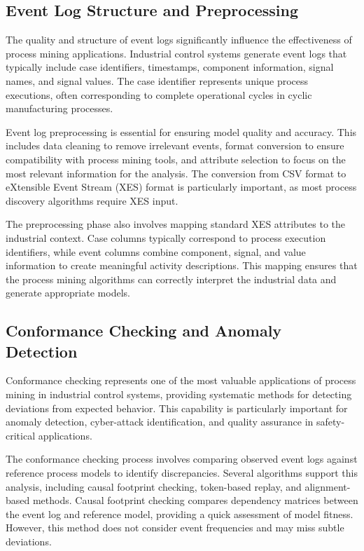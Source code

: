 \subsection{Event Log Structure and Preprocessing}

The quality and structure of event logs significantly influence the effectiveness of process mining applications. Industrial control systems generate event logs that typically include case identifiers, timestamps, component information, signal names, and signal values. The case identifier represents unique process executions, often corresponding to complete operational cycles in cyclic manufacturing processes.

Event log preprocessing is essential for ensuring model quality and accuracy. This includes data cleaning to remove irrelevant events, format conversion to ensure compatibility with process mining tools, and attribute selection to focus on the most relevant information for the analysis. The conversion from CSV format to eXtensible Event Stream (XES) format is particularly important, as most process discovery algorithms require XES input.


The preprocessing phase also involves mapping standard XES attributes to the industrial context. Case columns typically correspond to process execution identifiers, while event columns combine component, signal, and value information to create meaningful activity descriptions. This mapping ensures that the process mining algorithms can correctly interpret the industrial data and generate appropriate models.

\subsection{Conformance Checking and Anomaly Detection}

Conformance checking represents one of the most valuable applications of process mining in industrial control systems, providing systematic methods for detecting deviations from expected behavior. This capability is particularly important for anomaly detection, cyber-attack identification, and quality assurance in safety-critical applications.

The conformance checking process involves comparing observed event logs against reference process models to identify discrepancies. Several algorithms support this analysis, including causal footprint checking, token-based replay, and alignment-based methods. Causal footprint checking compares dependency matrices between the event log and reference model, providing a quick assessment of model fitness. However, this method does not consider event frequencies and may miss subtle deviations.


